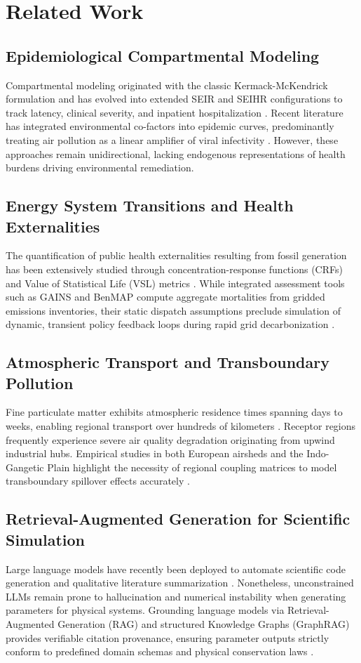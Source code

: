 \documentclass[conference]{IEEEtran}
\renewcommand{\_}{\textunderscore\allowbreak{}}%
\begin{document}
\section{Related Work}

\subsection{Epidemiological Compartmental Modeling}
Compartmental modeling originated with the classic Kermack-McKendrick formulation and has evolved into extended SEIR and SEIHR configurations to track latency, clinical severity, and inpatient hospitalization \cite{b_kermack, b_fractional_flu}. Recent literature has integrated environmental co-factors into epidemic curves, predominantly treating air pollution as a linear amplifier of viral infectivity \cite{b_air_covid}. However, these approaches remain unidirectional, lacking endogenous representations of health burdens driving environmental remediation.

\subsection{Energy System Transitions and Health Externalities}
The quantification of public health externalities resulting from fossil generation has been extensively studied through concentration-response functions (CRFs) and Value of Statistical Life (VSL) metrics \cite{b_who_aqg, b_german_coal}. While integrated assessment tools such as GAINS and BenMAP compute aggregate mortalities from gridded emissions inventories, their static dispatch assumptions preclude simulation of dynamic, transient policy feedback loops during rapid grid decarbonization \cite{b_benmap}.

\subsection{Atmospheric Transport and Transboundary Pollution}
Fine particulate matter exhibits atmospheric residence times spanning days to weeks, enabling regional transport over hundreds of kilometers \cite{b_emep}. Receptor regions frequently experience severe air quality degradation originating from upwind industrial hubs. Empirical studies in both European airsheds and the Indo-Gangetic Plain highlight the necessity of regional coupling matrices to model transboundary spillover effects accurately \cite{b_delhi_pm25, b_emep}.

\subsection{Retrieval-Augmented Generation for Scientific Simulation}
Large language models have recently been deployed to automate scientific code generation and qualitative literature summarization \cite{b_llm_science}. Nonetheless, unconstrained LLMs remain prone to hallucination and numerical instability when generating parameters for physical systems. Grounding language models via Retrieval-Augmented Generation (RAG) and structured Knowledge Graphs (GraphRAG) provides verifiable citation provenance, ensuring parameter outputs strictly conform to predefined domain schemas and physical conservation laws \cite{b_graphrag}.
\end{document}

